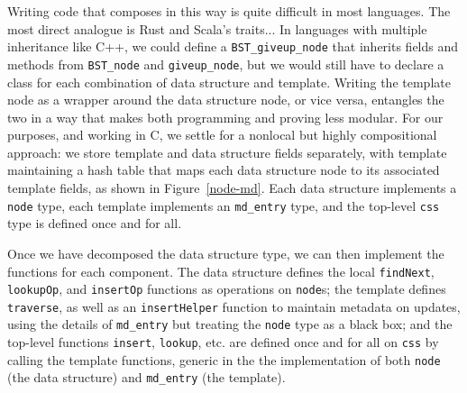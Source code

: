 \documentclass[sigplan,screen]{acmart}
\begin{document}
Writing code that composes in this way is quite difficult in most languages. The most direct analogue is Rust and Scala's traits... In languages with multiple inheritance like C++, we could define a \lstinline{BST_giveup_node} that inherits fields and methods from \lstinline{BST_node} and \lstinline{giveup_node}, but we would still have to declare a class for each combination of data structure and template. Writing the template node as a wrapper around the data structure node, or vice versa, entangles the two in a way that makes both programming and proving less modular. For our purposes, and working in C, we settle for a nonlocal but highly compositional approach: we store template and data structure fields separately, with template maintaining a hash table that maps each data structure node to its associated template fields, as shown in Figure~\ref{node-md}. Each data structure implements a \lstinline{node} type, each template implements an \lstinline{md_entry} type, and the top-level \lstinline{css} type is defined once and for all.

Once we have decomposed the data structure type, we can then implement the functions for each component. The data structure defines the local \lstinline{findNext}, \lstinline{lookupOp}, and \lstinline{insertOp} functions as operations on \lstinline{node}s; the template defines \lstinline{traverse}, as well as an \lstinline{insertHelper} function to maintain metadata on updates, using the details of \lstinline{md_entry} but treating the \lstinline{node} type as a black box; and the top-level functions \lstinline{insert}, \lstinline{lookup}, etc. are defined once and for all on \lstinline{css} by calling the template functions, generic in the the implementation of both \lstinline{node} (the data structure) and \lstinline{md_entry} (the template).
\end{document}
